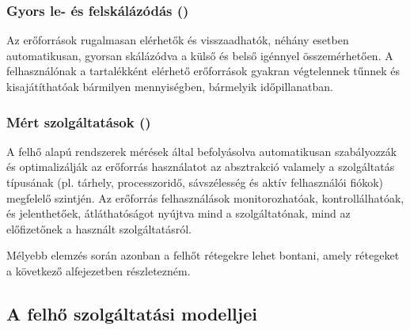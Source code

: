 \subsubsection{Gyors le- és felskálázódás ()}

Az erőforrások rugalmasan elérhetők és visszaadhatók, néhány esetben automatikusan, gyorsan skálázódva a külső és belső igénnyel összemérhetően. A felhasználónak a tartalékként elérhető erőforrások gyakran végtelennek tűnnek és kisajátíthatóak bármilyen mennyiségben, bármelyik időpillanatban.

\subsubsection{Mért szolgáltatások ()}

A felhő alapú rendszerek mérések által befolyásolva automatikusan szabályozzák és optimalizálják az erőforrás használatot az absztrakció valamely a szolgáltatás típusának (pl. tárhely, processzoridő, sávszélesség és aktív felhasználói fiókok) megfelelő szintjén. Az erőforrás felhasználások monitorozhatóak, kontrollálhatóak, és jelenthetőek, átláthatóságot nyújtva mind a szolgáltatónak, mind az előfizetőnek a használt szolgáltatásról.

Mélyebb elemzés során azonban a felhőt rétegekre lehet bontani, amely rétegeket a következő alfejezetben részletezném.

\subsection{A felhő szolgáltatási modelljei}

